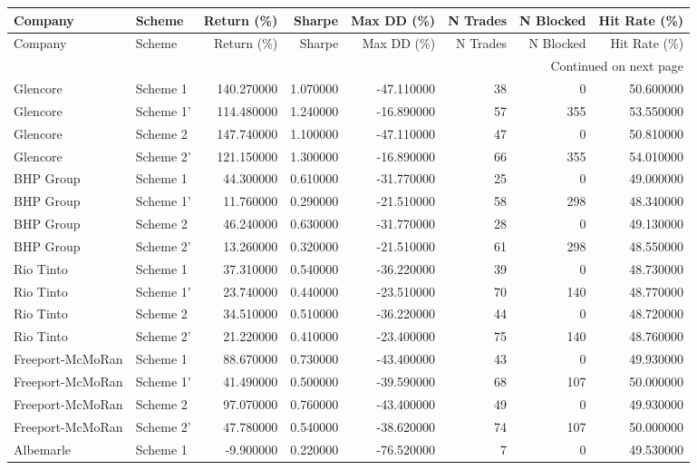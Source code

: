 \begin{longtable}{llrrrrrr}
\toprule
Company & Scheme & Return (\%) & Sharpe & Max DD (\%) & N Trades & N Blocked & Hit Rate (\%) \\
\midrule
\endfirsthead
\toprule
Company & Scheme & Return (\%) & Sharpe & Max DD (\%) & N Trades & N Blocked & Hit Rate (\%) \\
\midrule
\endhead
\midrule
\multicolumn{8}{r}{Continued on next page} \\
\midrule
\endfoot
\bottomrule
\endlastfoot
Glencore & Scheme 1 & 140.270000 & 1.070000 & -47.110000 & 38 & 0 & 50.600000 \\
Glencore & Scheme 1' & 114.480000 & 1.240000 & -16.890000 & 57 & 355 & 53.550000 \\
Glencore & Scheme 2 & 147.740000 & 1.100000 & -47.110000 & 47 & 0 & 50.810000 \\
Glencore & Scheme 2' & 121.150000 & 1.300000 & -16.890000 & 66 & 355 & 54.010000 \\
BHP Group & Scheme 1 & 44.300000 & 0.610000 & -31.770000 & 25 & 0 & 49.000000 \\
BHP Group & Scheme 1' & 11.760000 & 0.290000 & -21.510000 & 58 & 298 & 48.340000 \\
BHP Group & Scheme 2 & 46.240000 & 0.630000 & -31.770000 & 28 & 0 & 49.130000 \\
BHP Group & Scheme 2' & 13.260000 & 0.320000 & -21.510000 & 61 & 298 & 48.550000 \\
Rio Tinto & Scheme 1 & 37.310000 & 0.540000 & -36.220000 & 39 & 0 & 48.730000 \\
Rio Tinto & Scheme 1' & 23.740000 & 0.440000 & -23.510000 & 70 & 140 & 48.770000 \\
Rio Tinto & Scheme 2 & 34.510000 & 0.510000 & -36.220000 & 44 & 0 & 48.720000 \\
Rio Tinto & Scheme 2' & 21.220000 & 0.410000 & -23.400000 & 75 & 140 & 48.760000 \\
Freeport-McMoRan & Scheme 1 & 88.670000 & 0.730000 & -43.400000 & 43 & 0 & 49.930000 \\
Freeport-McMoRan & Scheme 1' & 41.490000 & 0.500000 & -39.590000 & 68 & 107 & 50.000000 \\
Freeport-McMoRan & Scheme 2 & 97.070000 & 0.760000 & -43.400000 & 49 & 0 & 49.930000 \\
Freeport-McMoRan & Scheme 2' & 47.780000 & 0.540000 & -38.620000 & 74 & 107 & 50.000000 \\
Albemarle & Scheme 1 & -9.900000 & 0.220000 & -76.520000 & 7 & 0 & 49.530000 \\

\end{longtable}
